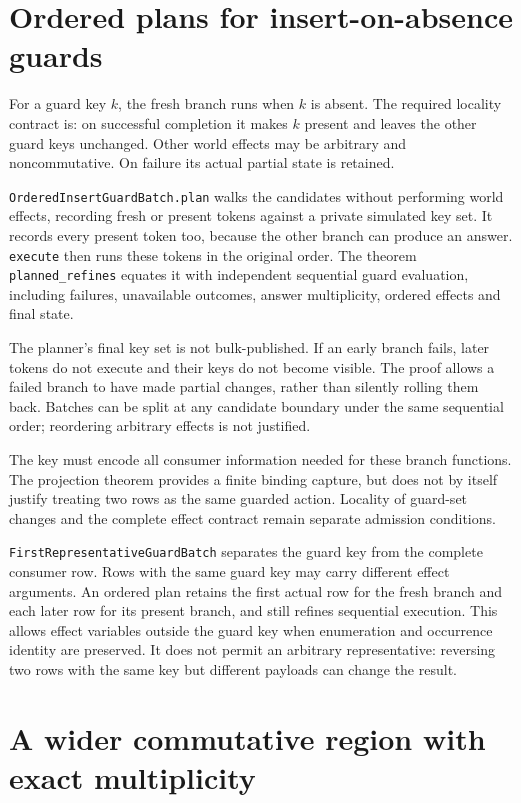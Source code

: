 \documentclass[11pt,a4paper]{article}
\newcommand{\code}[1]{\nolinkurl{#1}}
\begin{document}
\section{Ordered plans for insert-on-absence guards}

For a guard key $k$, the fresh branch runs when $k$ is absent. The required
locality contract is: on successful completion it makes $k$ present and leaves
the other guard keys unchanged. Other world effects may be arbitrary and
noncommutative. On failure its actual partial state is retained.

\code{OrderedInsertGuardBatch.plan} walks the candidates without performing
world effects, recording fresh or present tokens against a private simulated
key set. It records every present token too, because the other branch can
produce an answer. \code{execute} then runs these tokens in the original
order. The theorem \code{planned_refines} equates it with independent sequential
guard evaluation, including failures, unavailable outcomes, answer
multiplicity, ordered effects and final state.

The planner's final key set is not bulk-published. If an early branch fails,
later tokens do not execute and their keys do not become visible. The proof
allows a failed branch to have made partial changes, rather than silently
rolling them back. Batches can be split at any candidate boundary under the
same sequential order; reordering arbitrary effects is not justified.

The key must encode all consumer information needed for these branch
functions. The projection theorem provides a finite binding capture, but
does not by itself justify treating two rows as the same guarded action.
Locality of guard-set changes and the complete effect contract remain
separate admission conditions.

\code{FirstRepresentativeGuardBatch} separates the guard key from the complete
consumer row. Rows with the same guard key may carry different effect
arguments. An ordered plan retains the first actual row for the fresh branch
and each later row for its present branch, and still refines sequential
execution. This allows effect variables outside the guard key when enumeration
and occurrence identity are preserved. It does not permit an arbitrary
representative: reversing two rows with the same key but different payloads
can change the result.

\section{A wider commutative region with exact multiplicity}
\end{document}
